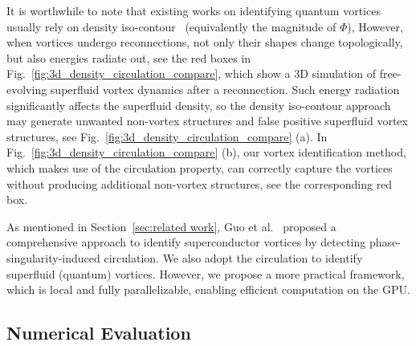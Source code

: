 \documentclass[10pt,journal,compsoc,twoside]{IEEEtran}
\newcommand{\rd}[1]{{\color[rgb]{0.0,0.0,0.0}{#1}}}
\begin{document}
	It is worthwhile to note that existing works on identifying quantum vortices usually rely on density iso-contour~\cite{Zuccher_12} (equivalently the magnitude of $\Phi$), \rd{which identifies vortices simply by thresholding the density value, and it drops to zero near vortex cores but being flat for other regions.}
	However, when vortices undergo reconnections, not only their shapes change topologically, but also energies radiate out, see the red boxes in Fig.~\ref{fig:3d_density_circulation_compare}, which show a 3D simulation of free-evolving superfluid vortex dynamics after a reconnection.
	Such energy radiation significantly affects the superfluid density, so the density iso-contour approach may generate unwanted non-vortex structures and false positive superfluid vortex structures, see Fig.~\ref{fig:3d_density_circulation_compare} (a).
	In Fig.~\ref{fig:3d_density_circulation_compare} (b), our vortex identification method, which makes use of the circulation property, can correctly capture the vortices without producing additional non-vortex structures, see the corresponding red box.
	
	As mentioned in Section~\ref{sec:related work}, Guo et al.~\cite{Guo_16} proposed a comprehensive approach to identify superconductor vortices by detecting phase-singularity-induced circulation.
	We also adopt the circulation to identify superfluid (quantum) vortices.
	However, we propose a more practical framework, which is local and fully parallelizable, enabling efficient computation on the GPU.
	

	\subsection{Numerical Evaluation}
	
\end{document}
